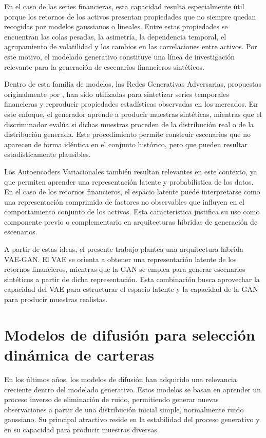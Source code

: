 En el caso de las series financieras, esta capacidad resulta especialmente útil porque los retornos de los activos presentan propiedades que no siempre quedan recogidas por modelos gaussianos o lineales. Entre estas propiedades se encuentran las colas pesadas, la asimetría, la dependencia temporal, el agrupamiento de volatilidad y los cambios en las correlaciones entre activos. Por este motivo, el modelado generativo constituye una línea de investigación relevante para la generación de escenarios financieros sintéticos.

Dentro de esta familia de modelos, las Redes Generativas Adversarias, propuestas originalmente por \cite{goodfellow2014generative}, han sido utilizadas para sintetizar series temporales financieras y reproducir propiedades estadísticas observadas en los mercados. En este enfoque, el generador aprende a producir muestras sintéticas, mientras que el discriminador evalúa si dichas muestras proceden de la distribución real o de la distribución generada. Este procedimiento permite construir escenarios que no aparecen de forma idéntica en el conjunto histórico, pero que pueden resultar estadísticamente plausibles.

Los Autoencoders Variacionales también resultan relevantes en este contexto, ya que permiten aprender una representación latente y probabilística de los datos. En el caso de los retornos financieros, el espacio latente puede interpretarse como una representación comprimida de factores no observables que influyen en el comportamiento conjunto de los activos. Esta característica justifica su uso como componente previo o complementario en arquitecturas híbridas de generación de escenarios.

A partir de estas ideas, el presente trabajo plantea una arquitectura híbrida VAE-GAN. El VAE se orienta a obtener una representación latente de los retornos financieros, mientras que la GAN se emplea para generar escenarios sintéticos a partir de dicha representación. Esta combinación busca aprovechar la capacidad del VAE para estructurar el espacio latente y la capacidad de la GAN para producir muestras realistas.

\section{Modelos de difusión para selección dinámica de carteras}

En los últimos años, los modelos de difusión han adquirido una relevancia creciente dentro del modelado generativo. Estos modelos se basan en aprender un proceso inverso de eliminación de ruido, permitiendo generar nuevas observaciones a partir de una distribución inicial simple, normalmente ruido gaussiano. Su principal atractivo reside en la estabilidad del proceso generativo y en su capacidad para producir muestras diversas.


